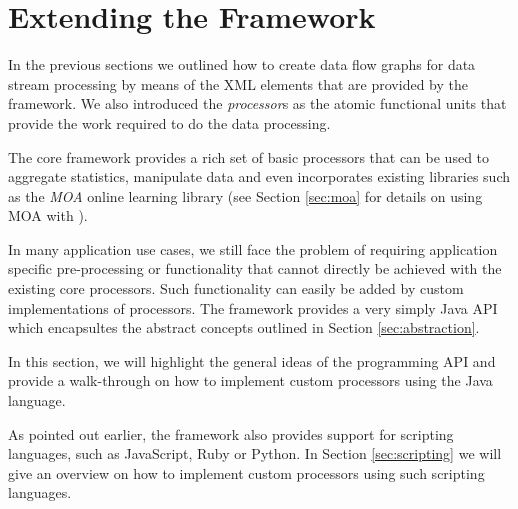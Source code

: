 \section{\label{sec:extendingStreams}Extending the \streams Framework}
In the previous sections we outlined how to create data flow graphs for
data stream processing by means of the XML elements that are provided
by the \streams framework. We also introduced the {\em processor}s as
the atomic functional units that provide the work required to do the
data processing.

The core \streams framework provides a rich set of basic processors that
can be used to aggregate statistics, manipulate data and even incorporates
existing libraries such as the {\em MOA} online learning library (see
Section \ref{sec:moa} for details on using MOA with \streams).

In many application use cases, we still face the problem of requiring
application specific pre-processing or functionality that cannot directly be 
achieved with the existing \streams core processors. Such functionality
can easily be added by custom implementations of processors. The \streams
framework provides a very simply Java API which encapsultes the abstract
concepts outlined in Section \ref{sec:abstraction}.

\medskip

In this section, we will highlight the general ideas of the \streams
programming API and provide a walk-through on how to implement custom
processors using the Java language. 

As pointed out earlier, the \streams framework also provides support
for scripting languages, such as JavaScript, Ruby or Python. In Section
\ref{sec:scripting} we will give an overview on how to implement custom
processors using such scripting languages.






%